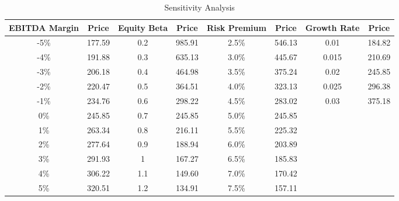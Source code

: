 \begin{table}[]
\centering
\begin{tabular}{@{}cccccccc@{}}
\toprule
EBITDA Margin & Price  & Equity Beta & Price  & Risk Premium & Price  & Growth Rate & Price  \\ \midrule
-5\%          & 177.59 & 0.2         & 985.91 & 2.5\%               & 546.13 & 0.01                 & 184.82 \\
-4\%          & 191.88 & 0.3         & 635.13 & 3.0\%               & 445.67 & 0.015                & 210.69 \\
-3\%          & 206.18 & 0.4         & 464.98 & 3.5\%               & 375.24 & 0.02                 & 245.85 \\
-2\%          & 220.47 & 0.5         & 364.51 & 4.0\%               & 323.13 & 0.025                & 296.38 \\
-1\%          & 234.76 & 0.6         & 298.22 & 4.5\%               & 283.02 & 0.03                 & 375.18 \\
0\%           & 245.85 & 0.7         & 245.85 & 5.0\%               & 245.85 &                      &        \\
1\%           & 263.34 & 0.8         & 216.11 & 5.5\%               & 225.32 &                      &        \\
2\%           & 277.64 & 0.9         & 188.94 & 6.0\%               & 203.89 &                      &        \\
3\%           & 291.93 & 1           & 167.27 & 6.5\%               & 185.83 &                      &        \\
4\%           & 306.22 & 1.1         & 149.60 & 7.0\%               & 170.42 &                      &        \\
5\%           & 320.51 & 1.2         & 134.91 & 7.5\%               & 157.11 &                      &        \\ \bottomrule
\end{tabular}
\caption{Sensitivity Analysis}
\label{tab:part1-sensitivity analysis}
\end{table}
